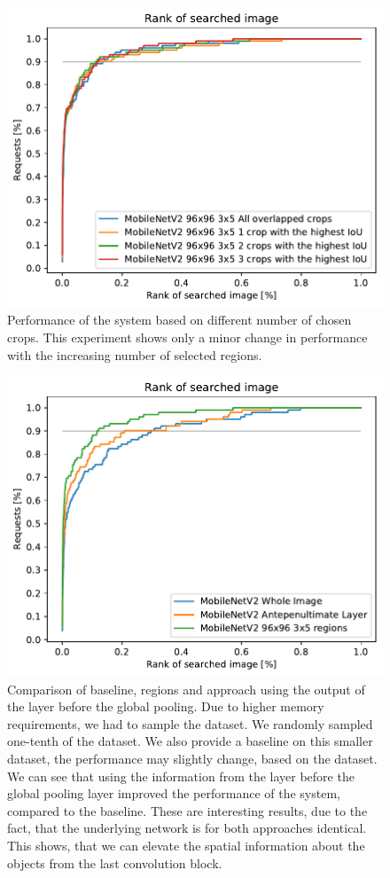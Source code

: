 \begin{figure}
\centering
\includegraphics[width=0.8\linewidth]{graphs/5c4a781f8e6f3eac93db2083bde3963c06582a92a8141411bf29e41251a98e75.pdf}
\caption{Performance of the system based on different number of chosen crops. This experiment shows only a minor change in performance with the increasing number of selected regions.}
\label{fig:crop_limitation}
\end{figure}

\begin{figure}
    \centering
    \includegraphics[width=0.8\linewidth]{graphs/adaf8d435bb40406f9ce40654ec396e04453ab76cf0776d2a87d385055d5424f.pdf}
    \caption{Comparison of baseline, regions and approach using the output of the layer before the global pooling. Due to higher memory requirements, we had to sample the dataset. We randomly sampled one-tenth of the dataset. We also provide a baseline on this smaller dataset, the performance may slightly change, based on the dataset. We can see that using the information from the layer before the global pooling layer improved the performance of the system, compared to the baseline. These are interesting results, due to the fact, that the underlying network is for both approaches identical. This shows, that we can elevate the spatial information about the objects from the last convolution block.}
    \label{fig:antepenultimate}
\end{figure}

